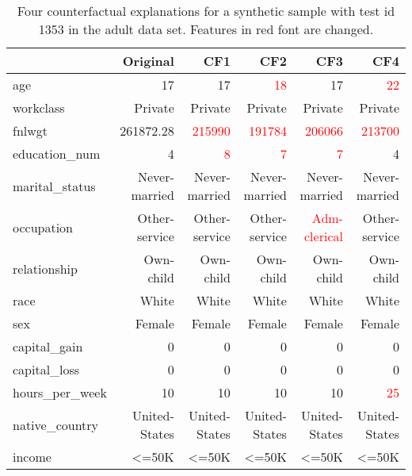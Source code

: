 \begin{table}[ht]
\centering
\begingroup\fontsize{8pt}{8pt}\selectfont
\begin{tabular}{|l|r|rrrr|}
  \toprule
 & Original & CF1 & CF2 & CF3 & CF4 \\ 
  \midrule
age & 17 & 17 & \textcolor{red}{18} & 17 & \textcolor{red}{22} \\ 
  workclass & Private & Private & Private & Private & Private \\ 
  fnlwgt & 261872.28 & \textcolor{red}{215990} & \textcolor{red}{191784} & \textcolor{red}{206066} & \textcolor{red}{213700} \\ 
  education\_num & 4 & \textcolor{red}{8} & \textcolor{red}{7} & \textcolor{red}{7} & 4 \\ 
  marital\_status & Never-married & Never-married & Never-married & Never-married & Never-married \\ 
  occupation & Other-service & Other-service & Other-service & \textcolor{red}{Adm-clerical} & Other-service \\ 
  relationship & Own-child & Own-child & Own-child & Own-child & Own-child \\ 
  race & White & White & White & White & White \\ 
  sex & Female & Female & Female & Female & Female \\ 
  capital\_gain & 0 & 0 & 0 & 0 & 0 \\ 
  capital\_loss & 0 & 0 & 0 & 0 & 0 \\ 
  hours\_per\_week & 10 & 10 & 10 & 10 & \textcolor{red}{25} \\ 
  native\_country & United-States & United-States & United-States & United-States & United-States \\ 
  income & <=50K & <=50K & <=50K & <=50K & <=50K \\ 
   \bottomrule
\end{tabular}
\endgroup
\caption{Four counterfactual explanations for a synthetic sample with test id 1353 in the adult data set. Features in red font are changed.} 
\label{tab:Q4_adult_complete_ce_syn_id_1353}
\end{table}
